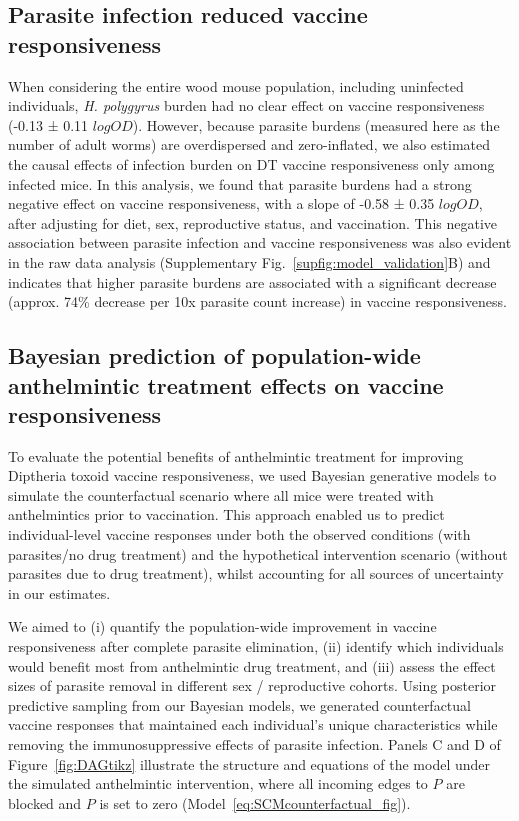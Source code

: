 \documentclass[a4paper, hidelinks, 11pt]{article}
\begin{document}
\subsection{Parasite infection reduced vaccine responsiveness}

When considering the entire wood mouse population, including uninfected individuals, \textit{H. polygyrus} burden had no clear effect on  vaccine responsiveness (-0.13 ± 0.11 $logOD$). However, because parasite burdens (measured here as the number of adult worms) are overdispersed and zero-inflated, we also estimated the causal effects of infection burden on DT vaccine responsiveness only among infected mice. In this analysis,  we found that parasite burdens had a strong negative effect on vaccine responsiveness, with a slope of -0.58 ± 0.35 $logOD$, after adjusting for diet, sex, reproductive status, and vaccination. This negative association between parasite infection and vaccine responsiveness was also evident in the raw data analysis (Supplementary Fig.~\ref{supfig:model_validation}B) and indicates that higher parasite burdens are associated with a significant decrease (approx. 74\% decrease per 10x parasite count increase) in vaccine responsiveness.

\subsection{Bayesian prediction of population-wide anthelmintic treatment effects on vaccine responsiveness}

To evaluate the potential benefits of anthelmintic treatment for improving Diptheria toxoid vaccine responsiveness, we used Bayesian generative models to simulate the counterfactual scenario where all mice were treated with anthelmintics prior to vaccination. This approach enabled us to predict individual-level vaccine responses under both the observed conditions (with parasites/no drug treatment) and the hypothetical intervention scenario (without parasites due to drug treatment), whilst accounting for all sources of uncertainty in our estimates.

We aimed to (i) quantify the population-wide improvement in vaccine responsiveness after complete parasite elimination, (ii) identify which individuals would benefit most from anthelmintic drug treatment, and (iii) assess the effect sizes of parasite removal in different sex / reproductive cohorts. Using posterior predictive sampling from our Bayesian models, we generated counterfactual vaccine responses that maintained each individual's unique characteristics while removing the immunosuppressive effects of parasite infection. Panels C and D of Figure~\ref{fig:DAGtikz} illustrate the structure and equations of the model under the simulated anthelmintic intervention, where all incoming edges to $P$ are blocked and $P$ is set to zero (Model~\ref{eq:SCMcounterfactual_fig}).
\end{document}
